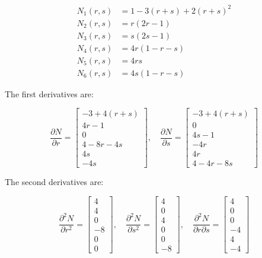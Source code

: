 \[
\begin{aligned}
N_1(r, s) &= 1 - 3(r + s) + 2(r + s)^2 \\
N_2(r, s) &= r(2r - 1) \\
N_3(r, s) &= s(2s - 1) \\
N_4(r, s) &= 4r(1 - r - s) \\
N_5(r, s) &= 4rs \\
N_6(r, s) &= 4s(1 - r - s)
\end{aligned}
\]

The first derivatives are:

\[
\frac{\partial N}{\partial r} =
\begin{bmatrix}
-3 + 4(r + s) \\
4r - 1 \\
0 \\
4 - 8r - 4s \\
4s \\
-4s
\end{bmatrix}, \quad
\frac{\partial N}{\partial s} =
\begin{bmatrix}
-3 + 4(r + s) \\
0 \\
4s - 1 \\
-4r \\
4r \\
4 - 4r - 8s
\end{bmatrix}
\]

The second derivatives are:

\[
\frac{\partial^2 N}{\partial r^2} =
\begin{bmatrix}
4 \\
4 \\
0 \\
-8 \\
0 \\
0
\end{bmatrix}, \quad
\frac{\partial^2 N}{\partial s^2} =
\begin{bmatrix}
4 \\
0 \\
4 \\
0 \\
0 \\
-8
\end{bmatrix}, \quad
\frac{\partial^2 N}{\partial r \partial s} =
\begin{bmatrix}
4 \\
0 \\
0 \\
-4 \\
4 \\
-4
\end{bmatrix}
\]
